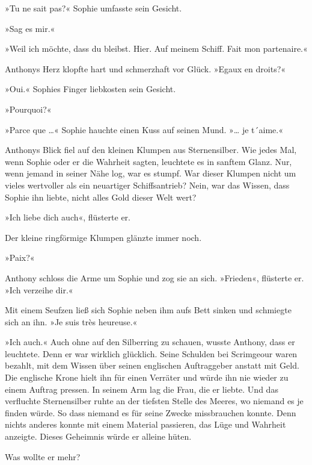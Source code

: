 »Tu ne sait pas?« Sophie umfasste sein Gesicht.

»Sag es mir.«

»Weil ich möchte, dass du bleibst. Hier. Auf meinem Schiff. Fait
mon partenaire.«

Anthonys Herz klopfte hart und schmerzhaft vor Glück. »Egaux en
droits?«

»Oui.« Sophies Finger liebkosten sein Gesicht.

»Pourquoi?«

»Parce que …« Sophie hauchte einen Kuss auf seinen Mund. »… je
t´aime.«

Anthonys Blick fiel auf den kleinen Klumpen aus Sternensilber. Wie
jedes Mal, wenn Sophie oder er die Wahrheit sagten, leuchtete es in
sanftem Glanz. Nur, wenn jemand in seiner Nähe log, war es stumpf.
War dieser Klumpen nicht um vieles wertvoller als ein neuartiger
Schiffsantrieb? Nein, war das Wissen, dass Sophie ihn liebte, nicht
alles Gold dieser Welt wert?

»Ich liebe dich auch«, flüsterte er.

Der kleine ringförmige Klumpen glänzte immer noch.

»Paix?«

Anthony schloss die Arme um Sophie und zog sie an sich. »Frieden«,
flüsterte er. »Ich verzeihe dir.«

Mit einem Seufzen ließ sich Sophie neben ihm aufs Bett sinken und
schmiegte sich an ihn. »Je suis très heureuse.«

»Ich auch.« Auch ohne auf den Silberring zu schauen, wusste
Anthony, dass er leuchtete. Denn er war wirklich glücklich. Seine
Schulden bei Scrimgeour waren bezahlt, mit dem Wissen über seinen
englischen Auftraggeber anstatt mit Geld. Die englische Krone hielt
ihn für einen Verräter und würde ihn nie wieder zu einem Auftrag
pressen. In seinem Arm lag die Frau, die er liebte. Und das
verfluchte Sternensilber ruhte an der tiefsten Stelle des Meeres,
wo niemand es je finden würde. So dass niemand es für seine Zwecke
missbrauchen konnte. Denn nichts anderes konnte mit einem Material
passieren, das Lüge und Wahrheit anzeigte. Dieses Geheimnis würde
er alleine hüten.

Was wollte er mehr?

